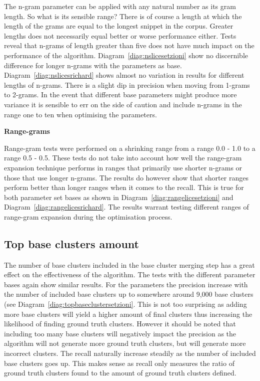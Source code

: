 The n-gram parameter can be applied with any natural number as its gram length. So what is its sensible range? There is of course a length at which the length of the grams are equal to the longest snippet in the corpus. Greater lengths does not necessarily equal better or worse performance either. Tests reveal that n-grams of length greater than five does not have much impact on the performance of the algorithm. Diagram~\ref{diag:nslicesetzioni} show no discernible difference for longer n-grams with the \citeauthor{Oren1998} parameters as base. Diagram~\ref{diag:nslicesrichard} shows almost no variation in results for different lengths of n-grams. There is a slight dip in precision when moving from 1-grams to 2-grams. In the event that different base parameters might produce more variance it is sensible to err on the side of caution and include n-grams in the range one to ten when optimising the parameters.

\textbf{Range-grams}

Range-gram tests were performed on a shrinking range from a range 0.0 - 1.0 to a range 0.5 - 0.5. These tests do not take into account how well the range-gram expansion technique performs in ranges that primarily use shorter n-grams or those that use longer n-grams. The results do however show that shorter ranges perform better than longer ranges when it comes to the recall. This is true for both parameter set bases as shown in Diagram~\ref{diag:rangelicesetzioni} and Diagram~\ref{diag:rangelicesrichard}. The results warrant testing different ranges of range-gram expansion during the optimisation process.

\subsection{Top base clusters amount}
The number of base clusters included in the base cluster merging step has a great effect on the effectiveness of the \CTC algorithm. The tests with the different parameter bases again show similar results. For the \citeauthor{Oren1998} parameters the precision increase with the number of included base clusters up to somewhere around 9,000 base clusters (see Diagram~\ref{diag:topbaseclustersetzioni}. This is not too surprising as adding more base clusters will yield a higher amount of final clusters thus increasing the likelihood of finding ground truth clusters. However it should be noted that including too many base clusters will negatively impact the precision as the algorithm will not generate more ground truth clusters, but will generate more incorrect clusters. The recall naturally increase steadily as the number of included base clusters goes up. This makes sense as recall only measures the ratio of ground truth clusters found to the amount of ground truth clusters defined.

